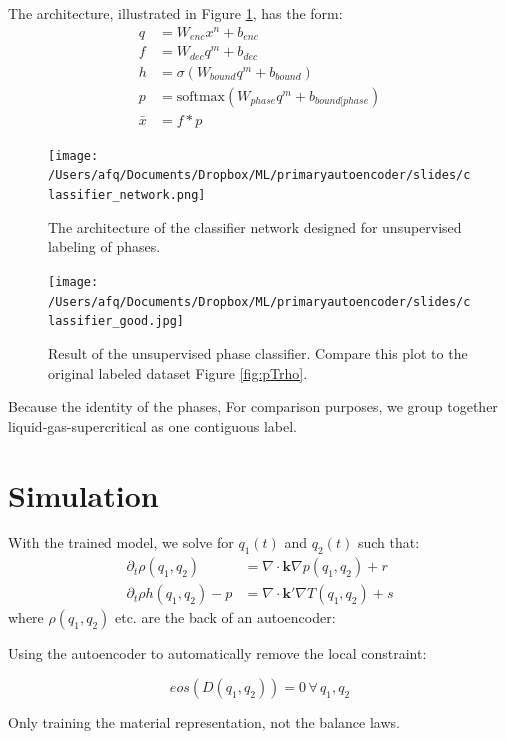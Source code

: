 \documentclass[]{article}
\begin{document}
The architecture, illustrated in Figure \ref{fig:classifyingnetwork}, has the form:
\begin{align}
  q &= W_{enc} x^n + b_{enc}\\
  f &= W_{dec} q^m + b_{dec} \\
  h &= \sigma\left(W_{bound}q^m+b_{bound}\right) \\
  p &= \text{softmax}\left(W_{phase}q^m+b_{bound[phase}\right) \\
  \bar{x}&= f * p
\end{align}

\begin{figure}
\centering
\texttt{[image: /Users/afq/Documents/Dropbox/ML/primaryautoencoder/slides/classifier\_network.png]}
\caption{\label{fig:classifyingnetwork}The architecture of the classifier network designed for
  unsupervised labeling of phases.}
\end{figure}

\begin{figure}
  \centering
  \texttt{[image: /Users/afq/Documents/Dropbox/ML/primaryautoencoder/slides/classifier\_good.jpg]}
  \caption{\label{fig:classified}Result of the unsupervised phase classifier. Compare this plot to the original labeled dataset Figure \ref{fig:pTrho}.}
\end{figure}
Because the identity of the phases,
For comparison purposes, we group together liquid-gas-supercritical as one contiguous label.

\hypertarget{header-n3321}{%
\section{Simulation}\label{header-n3321}}

With the trained model, we solve for \(q_1(t)\) and \(q_2(t)\) such that:
\begin{align}
\partial_t \rho(q_1,q_2) & = \nabla \cdot \mathbf{k} \nabla p(q_1,q_2) + r \\
\partial_t \rho h(q_1,q_2)-p & = \nabla \cdot \mathbf{k'}\nabla T(q_1,q_2) + s
\end{align}
where \(\rho(q_1,q_2)\) etc. are the back of an autoencoder:


Using the autoencoder to automatically remove the local constraint:

\begin{equation}
eos(D(q_1,q_2)) = 0 \, \forall \,q_1,q_2
\end{equation}

Only training the material representation, not the balance
laws.
\end{document}
